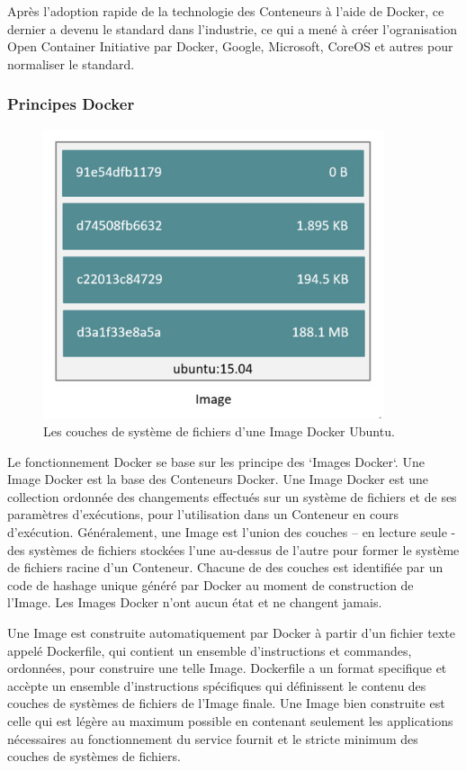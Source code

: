 Après l'adoption rapide de la technologie des Conteneurs à l'aide de Docker, ce dernier a devenu le standard dans l'industrie, ce qui a mené à créer l'ogranisation Open Container Initiative par Docker, Google, Microsoft, CoreOS et autres pour normaliser le standard.
\newline

\subsubsection{Principes Docker}

\begin{figure}[H]
    \centering
    \includegraphics[width=10cm]{images/ubuntu-image.png}
    \caption{Les couches de système de fichiers d'une Image Docker Ubuntu.}
    \label{fig:ubuntu-image}
\end{figure}

Le fonctionnement Docker se base sur les principe des `Images Docker`. Une Image Docker est la base des Conteneurs Docker. Une Image Docker est une collection ordonnée des changements effectués sur un système de fichiers et de ses paramètres d’exécutions, pour l’utilisation dans un Conteneur en cours d’exécution. Généralement, une Image est l’union des couches – en lecture seule - des systèmes de fichiers stockées l’une au-dessus de l’autre pour former le système de fichiers racine d’un Conteneur. Chacune de des couches est identifiée par un code de hashage unique généré par Docker au moment de construction de l’Image. Les Images Docker n’ont aucun état et ne changent jamais.
\newline

Une Image est construite automatiquement par Docker à partir d’un fichier texte appelé Dockerfile, qui contient un ensemble d’instructions et commandes,  ordonnées, pour construire une telle Image. Dockerfile a un format specifique et accèpte un ensemble d’instructions spécifiques qui définissent le contenu des couches de systèmes de fichiers de l’Image finale. Une Image bien construite est celle qui est légère au maximum possible en contenant seulement les applications nécessaires au fonctionnement du service fournit et le stricte minimum des couches de systèmes de fichiers.
\newline

